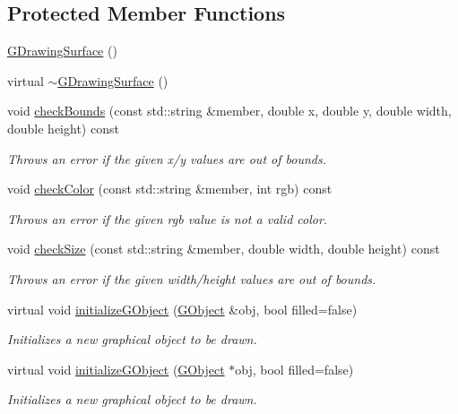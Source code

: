 \subsection*{Protected Member Functions}
\begin{DoxyCompactItemize}
\item 
\mbox{\hyperlink{classGDrawingSurface_a58ecf070e0880ac371754b3e6b4fd970}{G\+Drawing\+Surface}} ()
\item 
virtual \mbox{\hyperlink{classGDrawingSurface_a8e2c882a0c4e31fcbcbb86a207425c1f}{$\sim$\+G\+Drawing\+Surface}} ()
\item 
void \mbox{\hyperlink{classGDrawingSurface_a3a690bcb2d62250c9e4722ad7c1b9ab6}{check\+Bounds}} (const std\+::string \&member, double x, double y, double width, double height) const
\begin{DoxyCompactList}\small\item\em Throws an error if the given x/y values are out of bounds. \end{DoxyCompactList}\item 
void \mbox{\hyperlink{classGDrawingSurface_a9841b5dc607ca41a14819d80e1d8a09c}{check\+Color}} (const std\+::string \&member, int rgb) const
\begin{DoxyCompactList}\small\item\em Throws an error if the given rgb value is not a valid color. \end{DoxyCompactList}\item 
void \mbox{\hyperlink{classGDrawingSurface_a70a6546707ae708573396616bd0f5320}{check\+Size}} (const std\+::string \&member, double width, double height) const
\begin{DoxyCompactList}\small\item\em Throws an error if the given width/height values are out of bounds. \end{DoxyCompactList}\item 
virtual void \mbox{\hyperlink{classGDrawingSurface_a814498efebc5586645159cd22990cf61}{initialize\+G\+Object}} (\mbox{\hyperlink{classGObject}{G\+Object}} \&obj, bool filled=false)
\begin{DoxyCompactList}\small\item\em Initializes a new graphical object to be drawn. \end{DoxyCompactList}\item 
virtual void \mbox{\hyperlink{classGDrawingSurface_a43e6bc951980da061ddc40407daee227}{initialize\+G\+Object}} (\mbox{\hyperlink{classGObject}{G\+Object}} $\ast$obj, bool filled=false)
\begin{DoxyCompactList}\small\item\em Initializes a new graphical object to be drawn. \end{DoxyCompactList}\end{DoxyCompactItemize}
